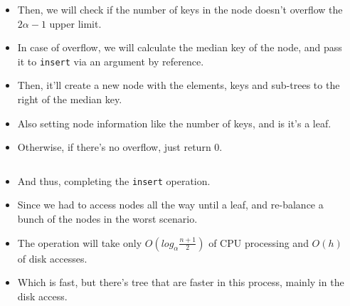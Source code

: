 \documentclass{beamer}
\begin{document}
\begin{frame}[t,allowframebreaks]
\begin{columns}
    \end{columns}
    \btreeInsertInternalPartTwo
    \begin{columns}
        \begin{column}{\textlecolumn}
            \begin{block}{}
                \begin{itemize}
                    \item Then, we will check if the number of keys in the node doesn't overflow the \(2\alpha - 1\) upper limit.
                    \item In case of overflow, we will calculate the median key of the node, and pass it to \lstinline|insert| via an argument by reference.
                    \item Then, it'll create a new node with the elements, keys and sub-trees to the right of the median key.
                    \item Also setting node information like the number of keys, and is it's a leaf.
                    \item Otherwise, if there's no overflow, just return 0.
                \end{itemize}
            \end{block}
        \end{column}
        \begin{column}{\textricolumn}
        \end{column}
    \end{columns}
    \btreeInsertInternalPartThree
    \vspace{-1cm}
    \begin{columns}
        \begin{column}{\textlecolumn}
            \begin{block}{}
                \begin{itemize}
                    \item And thus, completing the \lstinline|insert| operation.
                    \item Since we had to access nodes all the way until a leaf, and re-balance a bunch of the nodes in the worst scenario.
                    \item The operation will take only \(O\left(log_\alpha \frac{n + 1}{2}\right)\) of CPU processing and  \(O\left(h\right)\) of disk accesses.
                    \item Which is fast, but there's tree that are faster in this process, mainly in the disk access.
                \end{itemize}
            \end{block}
        \end{column}
        \begin{column}{\textricolumn}
        \end{column}
    \end{columns}
\end{frame}
\end{document}
